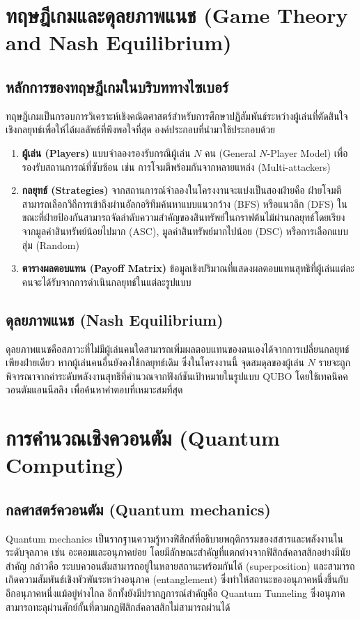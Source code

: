 \section{ทฤษฎีเกมและดุลยภาพแนช (Game Theory and Nash Equilibrium)}
\label{secgame_theory}

\subsection{หลักการของทฤษฎีเกมในบริบททางไซเบอร์}
ทฤษฎีเกมเป็นกรอบการวิเคราะห์เชิงคณิตศาสตร์สำหรับการศึกษาปฏิสัมพันธ์ระหว่างผู้เล่นที่ตัดสินใจเชิงกลยุทธ์เพื่อให้ได้ผลลัพธ์ที่พึงพอใจที่สุด องค์ประกอบที่นำมาใช้ประกอบด้วย
\begin{enumerate}
    \item \textbf{ผู้เล่น (Players)} แบบจำลองรองรับกรณีผู้เล่น $N$ คน (General $N$-Player Model) เพื่อรองรับสถานการณ์ที่ซับซ้อน เช่น การโจมตีพร้อมกันจากหลายแหล่ง (Multi-attackers)
    \item \textbf{กลยุทธ์ (Strategies)} จากสถานการณ์จำลองในโครงงานจะแบ่งเป็นสองฝ่ายคือ ฝ่ายโจมตีสามารถเลือกวิถีการเข้าถึงผ่านอัลกอริทึมค้นหาแบบแนวกว้าง (BFS) หรือแนวลึก (DFS) ในขณะที่ฝ่ายป้องกันสามารถจัดลำดับความสำคัญของสินทรัพย์ในกราฟต้นไม้ผ่านกลยุทธ์โดยเรียงจากมูลค่าสินทรัพย์น้อยไปมาก (ASC), มูลค่าสินทรัพย์มากไปน้อย (DSC) หรือการเลือกแบบสุ่ม (Random)
    \item \textbf{ตารางผลตอบแทน (Payoff Matrix)} ข้อมูลเชิงปริมาณที่แสดงผลตอบแทนสุทธิที่ผู้เล่นแต่ละคนจะได้รับจากการดำเนินกลยุทธ์ในแต่ละรูปแบบ
\end{enumerate}

\subsection{ดุลยภาพแนช (Nash Equilibrium)}
ดุลยภาพแนชคือสภาวะที่ไม่มีผู้เล่นคนใดสามารถเพิ่มผลตอบแทนของตนเองได้จากการเปลี่ยนกลยุทธ์เพียงฝ่ายเดียว \cite{nash} หากผู้เล่นคนอื่นยังคงใช้กลยุทธ์เดิม ซึ่งในโครงงานนี้ จุดสมดุลของผู้เล่น $N$ รายจะถูกพิจารณาจากค่าระดับพลังงานสุทธิที่คำนวณจากฟังก์ชันเป้าหมายในรูปแบบ QUBO โดยใช้เทคนิคควอนตัมแอนนีลลิง เพื่อค้นหาคำตอบที่เหมาะสมที่สุด

\section{การคำนวณเชิงควอนตัม (Quantum Computing)}
\label{secquantum_computing}

\subsection{กลศาสตร์ควอนตัม (Quantum mechanics)}
Quantum mechanics เป็นรากฐานความรู้ทางฟิสิกส์ที่อธิบายพฤติกรรมของสสารและพลังงานในระดับจุลภาค เช่น อะตอมและอนุภาคย่อย โดยมีลักษณะสำคัญที่แตกต่างจากฟิสิกส์คลาสสิกอย่างมีนัยสำคัญ กล่าวคือ ระบบควอนตัมสามารถอยู่ในหลายสถานะพร้อมกันได้ (superposition) และสามารถเกิดความสัมพันธ์เชิงพัวพันระหว่างอนุภาค (entanglement) ซึ่งทำให้สถานะของอนุภาคหนึ่งขึ้นกับอีกอนุภาคหนึ่งแม้อยู่ห่างไกล อีกทั้งยังมีปรากฏการณ์สำคัญคือ Quantum Tunneling ซึ่งอนุภาคสามารถทะลุผ่านศักย์กั้นที่ตามกฎฟิสิกส์คลาสสิกไม่สามารถผ่านได้

